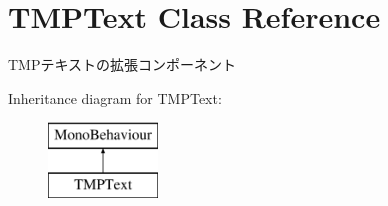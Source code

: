 \hypertarget{class_t_m_p_text}{}\section{T\+M\+P\+Text Class Reference}
\label{class_t_m_p_text}


T\+M\+Pテキストの拡張コンポーネント  


Inheritance diagram for T\+M\+P\+Text\+:\begin{figure}[H]
\begin{center}
\leavevmode
\includegraphics[height=2.000000cm]{class_t_m_p_text}
\end{center}
\end{figure}
